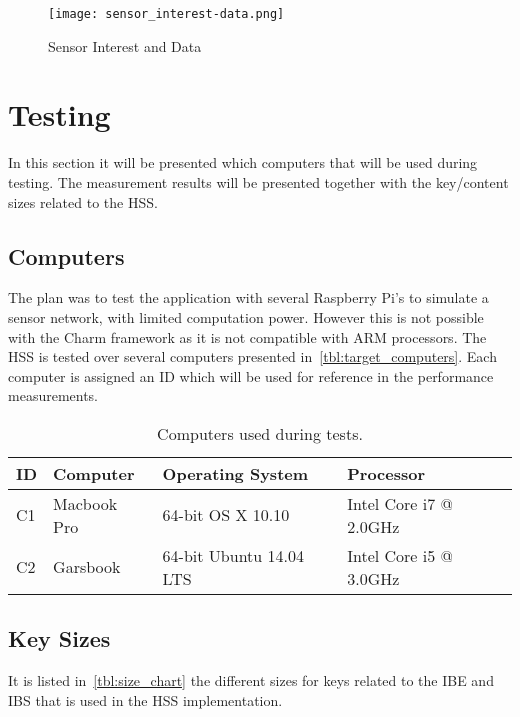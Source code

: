 \begin{figure}[ht]
  \centering
  \texttt{[image: sensor\_interest-data.png]}
  \caption{Sensor Interest and Data}
  \label{fig:sensor_interest-data}
\end{figure}

\section{Testing}
In this section it will be presented which computers that will be used during testing. 
The measurement results will be presented together with the key/content sizes related to the \gls{HSS}.

\subsection{Computers}
The plan was to test the application with several Raspberry Pi's to simulate a sensor network, with limited computation power.
However this is not possible with the Charm framework as it is not compatible with ARM processors.
The \gls{HSS} is tested over several computers presented in~\autoref{tbl:target_computers}.
Each computer is assigned an ID which will be used for reference in the performance measurements.

\begin{table}[h]
  \begin{tabular}{llll}
  ID      & Computer                  & Operating System          & Processor                    \\ \hline
  C1      & Macbook Pro               & 64-bit OS X 10.10         & Intel Core i7 @ 2.0GHz       \\ %
  C2      & Garsbook                  & 64-bit Ubuntu 14.04 LTS   & Intel Core i5 @ 3.0GHz       \\ %
  \end{tabular}
  \caption{Computers used during tests.}
  \label{tbl:target_computers}
\end{table}

\subsection{Key Sizes}
It is listed in~\autoref{tbl:size_chart} the different sizes for keys related to the \gls{IBE} and \gls{IBS} that is used in the \gls{HSS} implementation.

